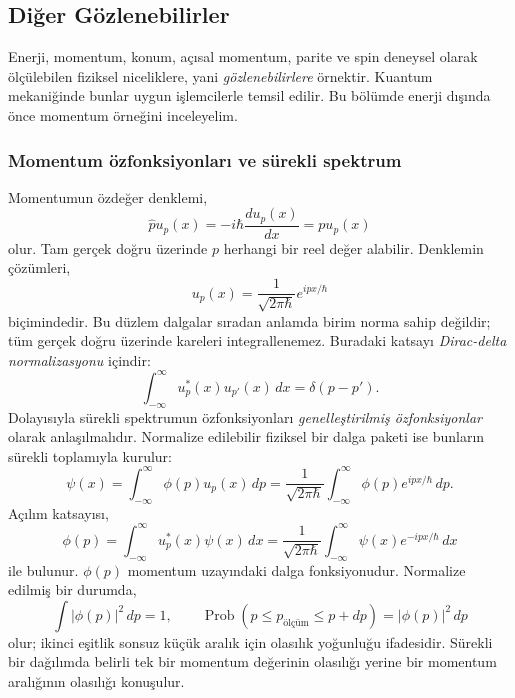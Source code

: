 \subsection{Diğer Gözlenebilirler}
\label{sec:05_gozlenebilirler}

Enerji, momentum, konum, açısal momentum, parite ve spin deneysel
olarak ölçülebilen fiziksel niceliklere, yani \emph{gözlenebilirlere}
örnektir. Kuantum mekaniğinde bunlar uygun işlemcilerle temsil edilir.
Bu bölümde enerji dışında önce momentum örneğini inceleyelim.

\subsubsection{Momentum özfonksiyonları ve sürekli spektrum}

Momentumun özdeğer denklemi,
\begin{equation}
 \hat p u_p(x)=-i\hbar\frac{du_p(x)}{dx}=p u_p(x)
\end{equation}
olur. Tam gerçek doğru üzerinde $p$ herhangi bir reel değer alabilir.
Denklemin çözümleri,
\begin{equation}
 \boxed{u_p(x)=\frac{1}{\sqrt{2\pi\hbar}}e^{ipx/\hbar}}
 \label{eq:05_momentum_ozfonksiyon}
\end{equation}
biçimindedir. Bu düzlem dalgalar sıradan anlamda birim norma sahip
değildir; tüm gerçek doğru üzerinde kareleri integrallenemez.
Buradaki katsayı \emph{Dirac-delta normalizasyonu} içindir:
\begin{equation}
 \int_{-\infty}^{\infty}u_p^*(x)u_{p'}(x)\,dx
 =\delta(p-p').
 \label{eq:05_momentum_delta_norm}
\end{equation}
Dolayısıyla sürekli spektrumun özfonksiyonları \emph{genelleştirilmiş
özfonksiyonlar} olarak anlaşılmalıdır. Normalize edilebilir fiziksel
bir dalga paketi ise bunların sürekli toplamıyla kurulur:
\begin{equation}
 \psi(x)=\int_{-\infty}^{\infty}\phi(p)u_p(x)\,dp
 =\frac{1}{\sqrt{2\pi\hbar}}
   \int_{-\infty}^{\infty}\phi(p)e^{ipx/\hbar}\,dp.
 \label{eq:05_momentum_acilim}
\end{equation}
Açılım katsayısı,
\begin{equation}
 \phi(p)=\int_{-\infty}^{\infty}u_p^*(x)\psi(x)\,dx
 =\frac{1}{\sqrt{2\pi\hbar}}
   \int_{-\infty}^{\infty}\psi(x)e^{-ipx/\hbar}\,dx
 \label{eq:05_momentum_katsayi}
\end{equation}
ile bulunur. $\phi(p)$ momentum uzayındaki dalga fonksiyonudur.
Normalize edilmiş bir durumda,
\begin{equation}
 \int|\phi(p)|^2\,dp=1,
 \qquad \operatorname{Prob}(p\le p_{\text{ölçüm}}\le p+dp)
 =|\phi(p)|^2\,dp
\end{equation}
olur; ikinci eşitlik sonsuz küçük aralık için olasılık yoğunluğu
ifadesidir. Sürekli bir dağılımda belirli tek bir momentum değerinin
olasılığı yerine bir momentum aralığının olasılığı konuşulur.

